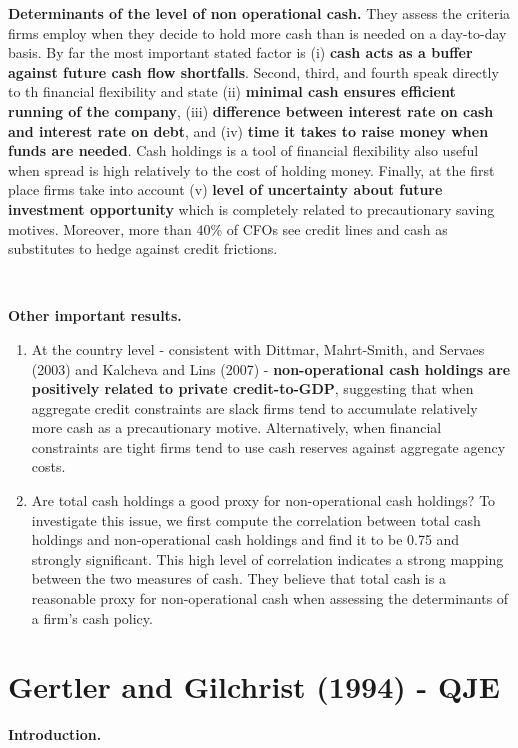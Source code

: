 \documentclass{article}
\begin{document}
{\textbf{Determinants of the level of non operational cash.} They assess the criteria firms employ when they decide to hold more cash than is needed on a day-to-day basis. By far the most important stated factor is (i) \textbf{cash acts as a buffer against future cash flow shortfalls}. Second, third, and fourth speak directly to th financial flexibility and state (ii) \textbf{minimal cash ensures efficient running of the company}, (iii) \textbf{difference between interest rate on cash and interest rate on debt}, and (iv) \textbf{time it takes to raise money when funds are needed}. Cash holdings is a tool of financial flexibility also useful when spread is high relatively to the cost of holding money. Finally, at the first place firms take into account (v) \textbf{level of uncertainty about future investment opportunity} which is completely related to precautionary saving motives. Moreover, more than 40\% of CFOs see credit lines and cash as substitutes to hedge against credit frictions.

\

\textbf{Other important results.} 
\begin{enumerate}
	\item At the country level - consistent with Dittmar, Mahrt-Smith, and Servaes (2003) and Kalcheva and Lins (2007) - \textbf{non-operational cash holdings are positively related to private credit-to-GDP}, suggesting that when aggregate credit constraints are slack firms tend to accumulate relatively more cash as a precautionary motive. Alternatively, when financial constraints are tight firms tend to use cash reserves against aggregate agency costs.
	\item Are total cash holdings a good proxy for non-operational cash holdings? To investigate this issue, we first compute the correlation between total cash holdings and non-operational cash holdings and find it to be 0.75 and strongly significant. This high level of correlation indicates a strong mapping between the two measures of cash. They believe that total cash is a reasonable proxy for non-operational cash when assessing the determinants of a firm's cash policy. 
\end{enumerate}




\section{Gertler and Gilchrist (1994) - QJE}

\begin{center}
\textbf{Introduction.}
\end{center} 

}
\end{document}
